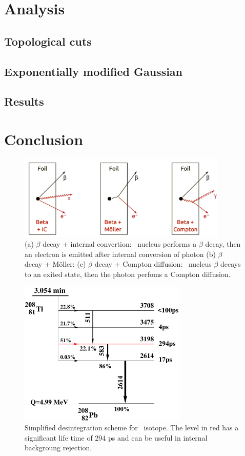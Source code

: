 \section{Analysis}
\subsection{Topological cuts}



\subsection{Exponentially modified Gaussian}
\subsection{Results}
\section{Conclusion}


\begin{figure}
  \centering
  \includegraphics[width=10cm]{timedifference/fig_timediff/internal_contamination.pdf}
  \caption{(a) $\beta$ decay + internal convertion: \Tl\ nucleus performs a $\beta$ decay, then an electron is emitted after internal conversion of photon
    (b) $\beta$ decay + Möller:
    (c) $\beta$ decay + Compton diffusion: \Tl\ nucleus $\beta$ decays to an exited state, then the photon perfoms a Compton diffusion.}
  \label{fig:internal_contamination}
\end{figure}

\begin{figure}
  \centering
  \includegraphics[width=8cm]{timedifference/fig_timediff/Desintegration_Tl.pdf}
  \caption{Simplified desintegration scheme for \Tl\ isotope.
    The level in red has a significant life time of $294$ ps and can be useful in internal backgroung rejection.}
  \label{fig:Tl_scheme}
\end{figure}

